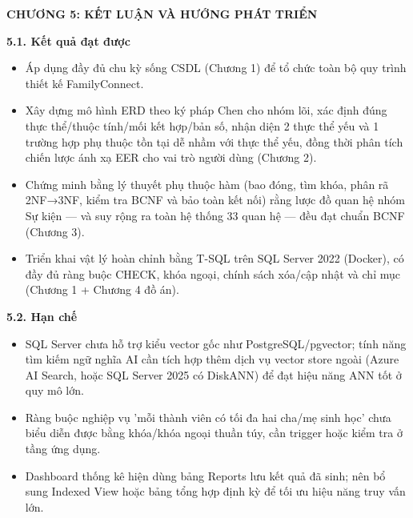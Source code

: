 
\clearpage
{}
{}
{\LARGE\bfseries CHƯƠNG 5: KẾT LUẬN VÀ HƯỚNG PHÁT TRIỂN}\par\vspace{1em}

{}
{\Large\bfseries 5.1. Kết quả đạt được}\par\vspace{0.7em}

\begin{itemize}
\item Áp dụng đầy đủ chu kỳ sống CSDL (Chương 1) để tổ chức toàn bộ quy trình thiết kế FamilyConnect.
\item Xây dựng mô hình ERD theo ký pháp Chen cho nhóm lõi, xác định đúng thực thể/thuộc tính/mối kết hợp/bản số, nhận diện 2 thực thể yếu và 1 trường hợp phụ thuộc tồn tại dễ nhầm với thực thể yếu, đồng thời phân tích chiến lược ánh xạ EER cho vai trò người dùng (Chương 2).
\item Chứng minh bằng lý thuyết phụ thuộc hàm (bao đóng, tìm khóa, phân rã 2NF→3NF, kiểm tra BCNF và bảo toàn kết nối) rằng lược đồ quan hệ nhóm Sự kiện — và suy rộng ra toàn hệ thống 33 quan hệ — đều đạt chuẩn BCNF (Chương 3).
\item Triển khai vật lý hoàn chỉnh bằng T-SQL trên SQL Server 2022 (Docker), có đầy đủ ràng buộc CHECK, khóa ngoại, chính sách xóa/cập nhật và chỉ mục (Chương 1 + Chương 4 đồ án).
\end{itemize}

{}
{\Large\bfseries 5.2. Hạn chế}\par\vspace{0.7em}

\begin{itemize}
\item SQL Server chưa hỗ trợ kiểu vector gốc như PostgreSQL/pgvector; tính năng tìm kiếm ngữ nghĩa AI cần tích hợp thêm dịch vụ vector store ngoài (Azure AI Search, hoặc SQL Server 2025 có DiskANN) để đạt hiệu năng ANN tốt ở quy mô lớn.
\item Ràng buộc nghiệp vụ 'mỗi thành viên có tối đa hai cha/mẹ sinh học' chưa biểu diễn được bằng khóa/khóa ngoại thuần túy, cần trigger hoặc kiểm tra ở tầng ứng dụng.
\item Dashboard thống kê hiện dùng bảng Reports lưu kết quả đã sinh; nên bổ sung Indexed View hoặc bảng tổng hợp định kỳ để tối ưu hiệu năng truy vấn lớn.
\end{itemize}


